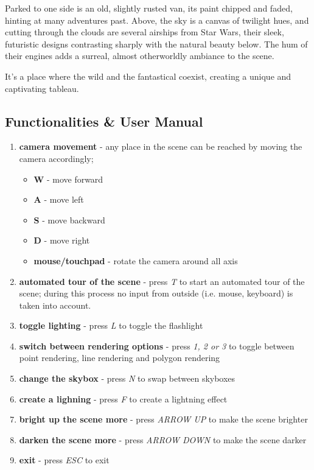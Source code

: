 \documentclass[12pt]{article}
\begin{document}
	Parked to one side is an old, slightly rusted van, its paint chipped and faded, hinting at many adventures past. Above, the sky is a canvas of twilight hues, and cutting through the clouds are several airships from Star Wars, their sleek, futuristic designs contrasting sharply with the natural beauty below. The hum of their engines adds a surreal, almost otherworldly ambiance to the scene.
	
	It's a place where the wild and the fantastical coexist, creating a unique and captivating tableau.  

	\subsection{Functionalities \& User Manual}
	
	\begin{enumerate}

		\item \textbf{camera movement} - any place in the scene can be reached by moving the camera accordingly; 

		\begin{itemize}
			\item \textbf{W} - move forward
			\item \textbf{A} - move left
			\item \textbf{S} - move backward
			\item \textbf{D} - move right
			\item \textbf{mouse/touchpad} - rotate the camera around all axis
		\end{itemize}

		\item \textbf{automated tour of the scene} - press \textit{T} to start an automated tour of the scene; during this process no input from outside (i.e. mouse, keyboard) is taken into account.		

		\item \textbf{toggle lighting} - press \textit{L} to toggle the flashlight
		\item \textbf{switch between rendering options} - press \textit{1, 2 or 3} to toggle between point rendering, line rendering and polygon rendering
		\item \textbf{change the skybox} - press \textit{N} to swap between skyboxes
		\item \textbf{create a lighning} - press \textit{F} to create a lightning effect
		\item \textbf{bright up the scene more} - press \textit{ARROW UP} to make the scene brighter
		\item \textbf{darken the scene more} - press \textit{ARROW DOWN} to make the scene darker
		\item \textbf{exit} - press \textit{ESC} to exit
		
	\end{enumerate}
	
\end{document}
